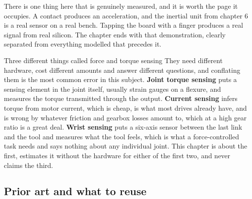 There is one thing here that is genuinely measured, and it is worth the page it
occupies. A contact produces an acceleration, and the inertial unit from chapter
6 is a real sensor on a real bench. Tapping the board with a finger produces a
real signal from real silicon. The chapter ends with that demonstration, clearly
separated from everything modelled that precedes it.

\begin{note}{Three different things called force and torque sensing}
They need different hardware, cost different amounts and answer different
questions, and conflating them is the most common error in this subject.
\textbf{Joint torque sensing} puts a sensing element in the joint itself,
usually strain gauges on a flexure, and measures the torque transmitted through
the output. \textbf{Current sensing} infers torque from motor current, which is
cheap, is what most drives already have, and is wrong by whatever friction and
gearbox losses amount to, which at a high gear ratio is a great deal.
\textbf{Wrist sensing} puts a six-axis sensor between the last link and the tool
and measures what the tool feels, which is what a force-controlled task needs
and says nothing about any individual joint. This chapter is about the first,
estimates it without the hardware for either of the first two, and never claims
the third.
\end{note}

\subsection*{Prior art and what to reuse}

